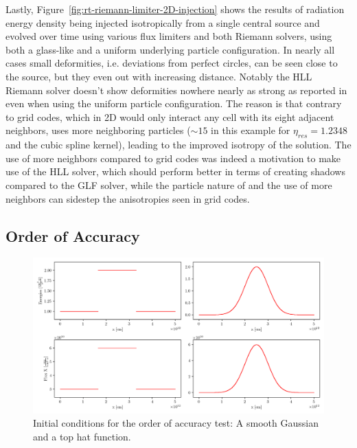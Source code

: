 Lastly, Figure~\ref{fig:rt-riemann-limiter-2D-injection} shows the results of radiation energy
density being injected isotropically from a single central source and evolved over time using
various flux limiters and both Riemann solvers, using both a glass-like and a uniform underlying
particle configuration. In nearly all cases small deformities, i.e. deviations from perfect circles,
can be seen close to the source, but they even out with increasing distance. Notably the HLL Riemann
solver doesn't show deformities nowhere nearly as strong as reported in \citet{ramses-rt13} even
when using the uniform particle configuration. The reason is that contrary to grid codes, which in
2D would only interact any cell with its eight adjacent neighbors, \GEARRT uses more neighboring
particles ($\sim 15$ in this example for $\eta_{res} = 1.2348$ and the cubic spline kernel), leading
to the improved isotropy of the solution. The use of more neighbors compared to grid codes was
indeed a motivation to make use of the HLL solver, which should perform better in terms of creating
shadows compared to the GLF solver, while the particle nature of \GEARRT and the use of more
neighbors can sidestep the anisotropies seen in grid codes.




\subsection{Order of Accuracy}


\begin{figure}
    \centering
    \includegraphics[width=\textwidth]{figures/RHD/accuracy/IC.png}%
    \caption{Initial conditions for the order of accuracy test: A smooth Gaussian and a top hat
function.}
    \label{fig:result-convergence-IC}
\end{figure}



